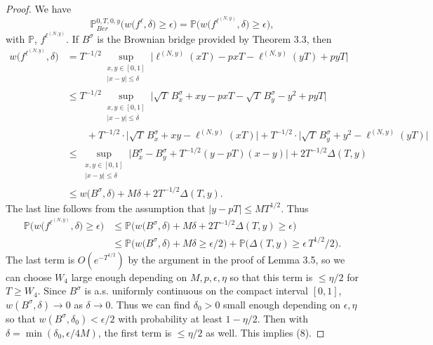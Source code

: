 \documentclass[12pt]{article}
\begin{document}
	\begin{proof}
		
		We have
		\[
		\mathbb{P}^{0,T,0,y}_{Ber}\Big( w\big({f^\ell},\delta\big) \geq \epsilon \Big) = \mathbb{P}\Big( w\big(f^{\ell^{(N,y)}},\delta\big) \geq \epsilon \Big),
		\]
		with $\mathbb{P}$, $f^{\ell^{(N,y)}}$. If $B^\sigma$ is the Brownian bridge provided by Theorem 3.3, then
		\begin{align*}
		w\big(f^{\ell^{(N,y)}},\delta\big) &= T^{-1/2} \sup_{\substack{x,y \in [0,1]\\ |x-y| \leq \delta}} \Big| \ell^{(N,y)}(xT) - pxT - \ell^{(N,y)}(yT) + pyT \Big|\\
		&\leq T^{-1/2} \sup_{\substack{x,y \in [0,1]\\ |x-y| \leq \delta}} \Big| \sqrt{T}\,B^\sigma_x + xy - pxT - \sqrt{T}\,B^\sigma_y - y^2 + pyT \Big|\\
		&\qquad + T^{-1/2}\cdot\Big|\sqrt{T}\,B^\sigma_x + xy - \ell^{(N,y)}(xT)\Big| + T^{-1/2}\cdot\Big|\sqrt{T}\,B^\sigma_y + y^2 - \ell^{(N,y)}(yT)\Big|\\
		&\leq \sup_{\substack{x,y \in [0,1]\\ |x-y| \leq \delta}} \Big| B^\sigma_x - B^\sigma_y + T^{-1/2} (y-pT)(x-y)\Big| + 2T^{-1/2}\Delta(T,y)\\
		&\leq w\big(B^\sigma,\delta\big) + M\delta + 2T^{-1/2}\Delta(T,y).
		\end{align*}
		The last line follows from the assumption that $|y-pT|\leq MT^{1/2}$. Thus
		\begin{align*}
		\mathbb{P}\Big( w\big(f^{\ell^{(N,y)}},\delta\big) \geq \epsilon \Big) &\leq \mathbb{P}\Big( w\big(B^\sigma,\delta\big) + M\delta + 2T^{-1/2}\Delta(T,y) \geq \epsilon \Big)\\
		&\leq \mathbb{P}\Big( w\big(B^\sigma,\delta\big) + M\delta \geq \epsilon/2 \Big) + \mathbb{P}\Big( \Delta(T,y) \geq \epsilon\, T^{1/2}/2 \Big).
		\end{align*}
		The last term is $O(e^{-T^{1/2}})$ by the argument in the proof of Lemma 3.5, so we can choose $W_4$ large enough depending on $M,p,\epsilon,\eta$ so that this term is $\leq\eta/2$ for $T\geq W_4$. Since $B^\sigma$ is a.s. uniformly continuous on the compact interval $[0,1]$, $w(B^\sigma,\delta) \to 0$ as $\delta\to 0$. Thus we can find $\delta_0>0$ small enough depending on $\epsilon,\eta$ so that $w(B^\sigma,\delta_0) < \epsilon/2$ with probability at least $1-\eta/2$. Then with $\delta = \min(\delta_0, \epsilon/4M)$, the first term is $\leq\eta/2$ as well. This implies (8).
		
	\end{proof}
\end{document}
